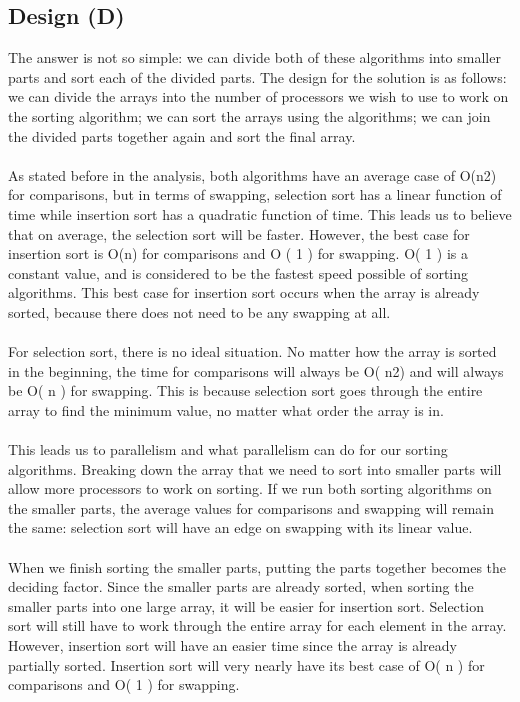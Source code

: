 \documentclass[12pt]{article}
\begin{document}
        \subsection{Design (D)}
        The answer is not so simple: we can divide both of these algorithms into smaller parts and sort each of the divided parts. 
        The design for the solution is as follows: we can divide the arrays into the number of processors we wish to use to work on
        the sorting algorithm; we can sort the arrays using the algorithms; we can join the divided parts together again and sort the
        final array. \\
        \\
        As stated before in the analysis, both algorithms have an average case of O(n2) for comparisons, but in terms of swapping, 
        selection sort has a linear function of time while insertion sort has a quadratic function of time. This leads us to believe
        that on average, the selection sort will be faster. However, the best case for insertion sort is O(n) for comparisons and O ( 1 ) 
        for swapping. O( 1 ) is a constant value, and is considered to be the fastest speed possible of sorting algorithms. This best case
        for insertion sort occurs when the array is already sorted, because there does not need to be any swapping at all. \\
        \\
        For selection sort, there is no ideal situation. No matter how the array is sorted in the beginning, the time for comparisons will
        always be O( n2) and will always be O( n ) for swapping. This is because selection sort goes through the entire array to find the
        minimum value, no matter what order the array is in. \\
        \\
        This leads us to parallelism and what parallelism can do for our sorting algorithms. Breaking down the array that we need to sort 
        into smaller parts will allow more processors to work on sorting. If we run both sorting algorithms on the smaller parts, the average 
        values for comparisons and swapping will remain the same: selection sort will have an edge on swapping with its linear value. \\
        \\
        When we finish sorting the smaller parts, putting the parts together becomes the deciding factor. Since the smaller parts are already 
        sorted, when sorting the smaller parts into one large array, it will be easier for insertion sort. Selection sort will still have to 
        work through the entire array for each element in the array. However, insertion sort will have an easier time since the array is already 
        partially sorted. Insertion sort will very nearly have its best case of O( n ) for comparisons and O( 1 ) for swapping. \\
        \\
\end{document}
